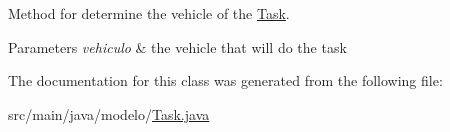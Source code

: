 Method for determine the vehicle of the \mbox{\hyperlink{classmodelo_1_1_task}{Task}}. 


\begin{DoxyParams}{Parameters}
{\em vehiculo} & the vehicle that will do the task \\
\hline
\end{DoxyParams}


The documentation for this class was generated from the following file\+:\begin{DoxyCompactItemize}
\item 
src/main/java/modelo/\mbox{\hyperlink{_task_8java}{Task.\+java}}\end{DoxyCompactItemize}
